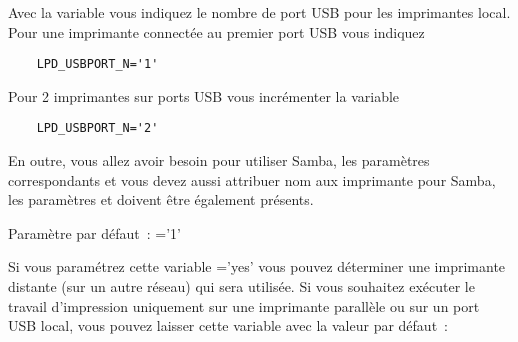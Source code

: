 \begin{description}
    Avec la variable  vous indiquez le nombre de port
    USB pour les imprimantes local. Pour une imprimante connectée au premier
    port USB vous indiquez

\begin{example}
\begin{verbatim}
    LPD_USBPORT_N='1'
\end{verbatim}
\end{example}

    Pour 2 imprimantes sur ports USB vous incrémenter la variable 

\begin{example}
\begin{verbatim}
    LPD_USBPORT_N='2'
\end{verbatim}
\end{example}

    En outre, vous allez avoir besoin pour utiliser Samba, les paramètres correspondants
     et 
    vous devez aussi attribuer nom aux imprimante pour Samba, les paramètres
     et 
    doivent être également présents.


    Paramètre par défaut~: ='1'



    Si vous paramétrez cette variable ='yes' vous pouvez
    déterminer une imprimante distante (sur un autre réseau) qui sera utilisée. Si
    vous souhaitez exécuter le travail d'impression uniquement sur une imprimante
    parallèle ou sur un port USB local, vous pouvez laisser cette variable
    avec la valeur par défaut~:


\end{description}
